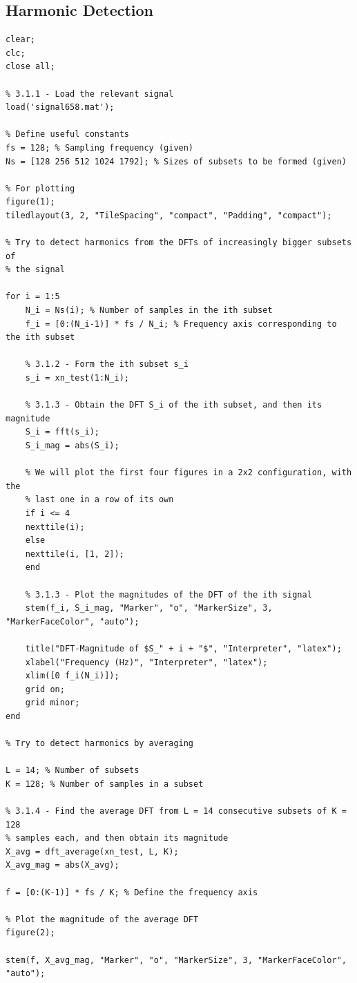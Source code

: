 \documentclass{article}[a4paper]
\begin{document}
	\subsection{Harmonic Detection}
	\begin{lstlisting}[caption={Main Code}, label=harmonic_main]
clear;
clc;
close all;

% 3.1.1 - Load the relevant signal
load('signal658.mat');

% Define useful constants
fs = 128; % Sampling frequency (given)
Ns = [128 256 512 1024 1792]; % Sizes of subsets to be formed (given)

% For plotting
figure(1);
tiledlayout(3, 2, "TileSpacing", "compact", "Padding", "compact");

% Try to detect harmonics from the DFTs of increasingly bigger subsets of
% the signal

for i = 1:5
	N_i = Ns(i); % Number of samples in the ith subset
	f_i = [0:(N_i-1)] * fs / N_i; % Frequency axis corresponding to the ith subset
	
	% 3.1.2 - Form the ith subset s_i
	s_i = xn_test(1:N_i);
	
	% 3.1.3 - Obtain the DFT S_i of the ith subset, and then its magnitude
	S_i = fft(s_i);
	S_i_mag = abs(S_i);
	
	% We will plot the first four figures in a 2x2 configuration, with the
	% last one in a row of its own
	if i <= 4
	nexttile(i);
	else
	nexttile(i, [1, 2]);
	end
	
	% 3.1.3 - Plot the magnitudes of the DFT of the ith signal
	stem(f_i, S_i_mag, "Marker", "o", "MarkerSize", 3, "MarkerFaceColor", "auto");
	
	title("DFT-Magnitude of $S_" + i + "$", "Interpreter", "latex");
	xlabel("Frequency (Hz)", "Interpreter", "latex");
	xlim([0 f_i(N_i)]);
	grid on;
	grid minor;
end

% Try to detect harmonics by averaging

L = 14; % Number of subsets
K = 128; % Number of samples in a subset

% 3.1.4 - Find the average DFT from L = 14 consecutive subsets of K = 128
% samples each, and then obtain its magnitude
X_avg = dft_average(xn_test, L, K);
X_avg_mag = abs(X_avg);

f = [0:(K-1)] * fs / K; % Define the frequency axis

% Plot the magnitude of the average DFT
figure(2);

stem(f, X_avg_mag, "Marker", "o", "MarkerSize", 3, "MarkerFaceColor", "auto");


\end{lstlisting}
\end{document}
